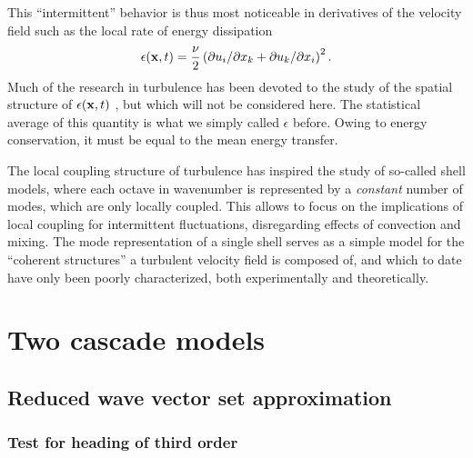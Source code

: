 \documentclass[dc]{svjour}
\begin{document}
This ``intermittent'' behavior is thus most noticeable in derivatives
of the velocity field such as the local rate of energy dissipation
\[
\epsilon({\bf x},t) = \frac{\nu}{2}\left(\partial u_i/\partial x_k
             + \partial u_k/\partial x_i\right)^2 .
\]
Much of the research in turbulence has been devoted to the study
of the spatial structure of $\epsilon({\bf x},t)$
\cite{kolmogorov62,nelkin89}, but which will not be considered here.
The statistical average of this quantity is what we simply called
$\epsilon$ before. Owing to energy conservation, it must be equal
to the mean energy transfer.

The local coupling structure of turbulence has inspired the study
of so-called shell models, where each octave in wavenumber is
represented by a {\it constant} number of modes, which are
only locally coupled. This allows to focus on the implications of
local coupling for intermittent fluctuations, disregarding
effects of convection and mixing. The mode representation
of a single shell serves as a simple model for the ``coherent
structures'' a turbulent velocity field is composed of, and which
to date have only been poorly characterized, both experimentally and
theoretically.



\section{Two cascade models}
\label{sec:model}
\subsection{Reduced wave vector set approximation}
\subsubsection{Test for heading of third order}
\end{document}
